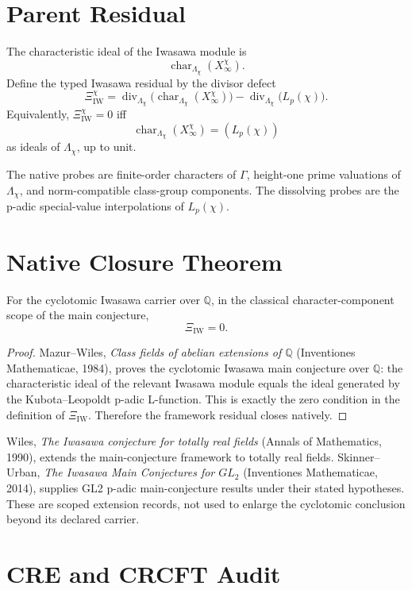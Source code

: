 \documentclass[11pt]{article}
\newcommand{\Q}{\mathbb Q}
\newcommand{\XiIW}{\Xi_{\mathrm{IW}}}
\newcommand{\Char}{\operatorname{char}}
\begin{document}
\section*{Parent Residual}

The characteristic ideal of the Iwasawa module is
\[
\Char_{\Lambda_\chi}(X_\infty^\chi).
\]
Define the typed Iwasawa residual by the divisor defect
\[
\XiIW^\chi
  =
  \operatorname{div}_{\Lambda_\chi}
  \bigl(\Char_{\Lambda_\chi}(X_\infty^\chi)\bigr)
  -
  \operatorname{div}_{\Lambda_\chi}
  \bigl(L_p(\chi)\bigr).
\]
Equivalently, \(\XiIW^\chi=0\) iff
\[
\Char_{\Lambda_\chi}(X_\infty^\chi)=(L_p(\chi))
\]
as ideals of \(\Lambda_\chi\), up to unit.

The native probes are finite-order characters of \(\Gamma\), height-one prime valuations of \(\Lambda_\chi\), and norm-compatible class-group components.  The dissolving probes are the p-adic special-value interpolations of \(L_p(\chi)\).

\section*{Native Closure Theorem}

\begin{theorem}
For the cyclotomic Iwasawa carrier over \(\Q\), in the classical character-component scope of the main conjecture,
\[
\XiIW=0.
\]
\end{theorem}

\begin{proof}
Mazur--Wiles, \emph{Class fields of abelian extensions of \(\Q\)} (Inventiones Mathematicae, 1984), proves the cyclotomic Iwasawa main conjecture over \(\Q\): the characteristic ideal of the relevant Iwasawa module equals the ideal generated by the Kubota--Leopoldt p-adic L-function.  This is exactly the zero condition in the definition of \(\XiIW\).  Therefore the framework residual closes natively.
\end{proof}

Wiles, \emph{The Iwasawa conjecture for totally real fields} (Annals of Mathematics, 1990), extends the main-conjecture framework to totally real fields.  Skinner--Urban, \emph{The Iwasawa Main Conjectures for \(GL_2\)} (Inventiones Mathematicae, 2014), supplies GL2 p-adic main-conjecture results under their stated hypotheses.  These are scoped extension records, not used to enlarge the cyclotomic conclusion beyond its declared carrier.

\section*{CRE and CRCFT Audit}
\end{document}
